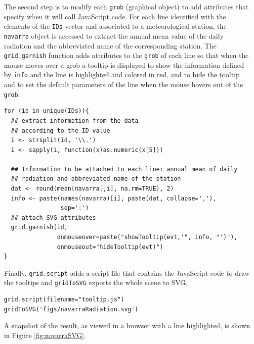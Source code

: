 The second step is to modify each \texttt{grob} (graphical object) to add
attributes that specify when it will call JavaScript code. For
each line identified with the elements of the \texttt{IDs} vector and
associated to a meteorological station, the \texttt{navarra} object is
accessed to extract the annual mean value of the daily radiation
and the abbreviated name of the corresponding station.  The
\texttt{grid.garnish} function adds attributes to the \texttt{grob} of each line
so that when the mouse moves over a grob a tooltip is displayed to
show the information defined by \texttt{info} and the line is highlighted
and colored in red, and to hide the tooltip and to set the default
parameters of the line when the mouse hovers out of the \texttt{grob}.


\lstset{language=R}
\begin{lstlisting}
for (id in unique(IDs)){
  ## extract information from the data
  ## according to the ID value
  i <- strsplit(id, '\\.')
  i <- sapply(i, function(x)as.numeric(x[5]))

  ## Information to be attached to each line: annual mean of daily
  ## radiation and abbreviated name of the station
  dat <- round(mean(navarra[,i], na.rm=TRUE), 2)
  info <- paste(names(navarra)[i], paste(dat, collapse=','),
                sep=':')
  ## attach SVG attributes
  grid.garnish(id,
               onmouseover=paste("showTooltip(evt,'", info, "')"),
               onmouseout="hideTooltip(evt)")
}
\end{lstlisting}


Finally, \texttt{grid.script} adds a script file that contains the
JavaScript code to draw the tooltips and \texttt{gridToSVG} exports
the whole scene to SVG. 


\lstset{language=R}
\begin{lstlisting}
grid.script(filename="tooltip.js")
gridToSVG('figs/navarraRadiation.svg')
\end{lstlisting}


A snapshot of the result, as viewed in a browser with a line
highlighted, is shown in Figure \ref{fig:navarraSVG}.


